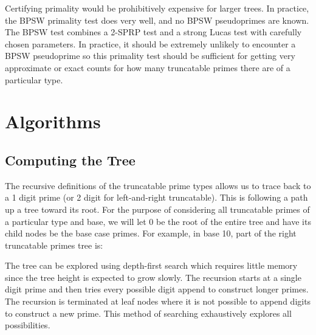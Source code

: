 \documentclass[12pt]{article}
\begin{document}
Certifying primality would be prohibitively expensive for larger trees. In practice, the BPSW primality test does very well, and no BPSW pseudoprimes are known. The BPSW test combines a 2-SPRP test and a strong Lucas test with carefully chosen parameters. In practice, it should be extremely unlikely to encounter a BPSW pseudoprime so this primality test should be sufficient for getting very approximate or exact counts for how many truncatable primes there are of a particular type.

\section{Algorithms}

\subsection{Computing the Tree}

The recursive definitions of the truncatable prime types allows us to trace back to a 1 digit prime (or 2 digit for left-and-right truncatable). This is following a path up a tree toward its root. For the purpose of considering all truncatable primes of a particular type and base, we will let 0 be the root of the entire tree and have its child nodes be the base case primes. For example, in base 10, part of the right truncatable primes tree is:

\begin{center}
\end{center}

The tree can be explored using depth-first search which requires little memory since the tree height is expected to grow slowly. The recursion starts at a single digit prime and then tries every possible digit append to construct longer primes. The recursion is terminated at leaf nodes where it is not possible to append digits to construct a new prime. This method of searching exhaustively explores all possibilities.
\end{document}
